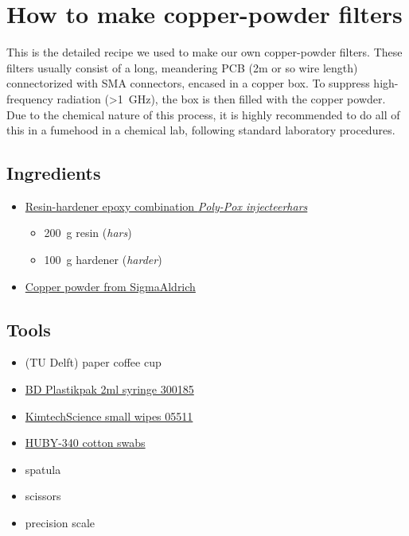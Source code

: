 \chapter{How to make copper-powder filters}
\label{app:copperpowder}

This is the detailed recipe we used to make our own copper-powder filters.
These filters usually consist of a long, meandering PCB (2m or so wire length) connectorized with SMA connectors, encased in a copper box. To suppress high-frequency radiation (>\SI{1}{\giga\hertz}), the box is then filled with the copper powder. Due to the chemical nature of this process, it is highly recommended to do all of this in a fumehood in a chemical lab, following standard laboratory procedures.

\section{Ingredients}
\begin{itemize}
	\item \href{https://www.polyservice.nl/epoxyhars-sets/374-poly-pox-injecteerhars.html?search_query=injecteer&results=8}{Resin-hardener epoxy combination \textit{Poly-Pox injecteerhars}}
	\begin{itemize}
		\item \SI{200}{\gram} resin (\textit{hars})
		\item \SI{100}{\gram} hardener (\textit{harder})
	\end{itemize}
	\item \href{https://www.sigmaaldrich.com/catalog/product/aldrich/326453?lang=en&region=NL}{Copper powder from SigmaAldrich}
\end{itemize}

\section{Tools}
\begin{itemize}
	\item (TU Delft) paper coffee cup
	\item \href{https://www.lab-shop.co.uk/liquid-handling-4597/plastipak-sterile-disposable-syringes-4469/plastipak-300185-sterile-disposable-425054.htm}{BD Plastikpak 2ml syringe 300185}
	\item \href{http://www.kcprofessional.com/en-us/products/wipers/specialty-wipers/05511}{KimtechScience small wipes 05511}
	\item \href{http://www.cleancross.net/english/products/threeinch_slim.html#BB-001}{HUBY-340 cotton swabs}
	\item spatula
	\item scissors
	\item precision scale
\end{itemize}

